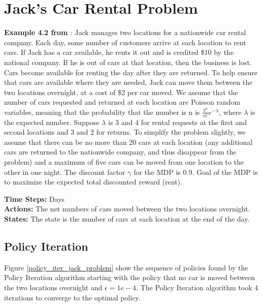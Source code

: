 \documentclass{article}
\newcommand{\citecustom}[1]{\citeauthor{#1} \cite{#1}}
\begin{document}
\section{Jack's Car Rental Problem}
\textbf{Example 4.2 from \citecustom{sutton2018reinforcement}}: Jack manages two locations for a nationwide car
rental company. Each day, some number of customers arrive at each location to rent cars.
If Jack has a car available, he rents it out and is credited \$10 by the national company.
If he is out of cars at that location, then the business is lost. Cars become available for
renting the day after they are returned. To help ensure that cars are available where
they are needed, Jack can move them between the two locations overnight, at a cost of
\$2 per car moved. We assume that the number of cars requested and returned at each
location are Poisson random variables, meaning that the probability that the number is
n is $\frac{\lambda^{n}}{n!}e^{-\lambda}$, where $\lambda$ is the expected number. Suppose $\lambda$ is 3 and 4 for rental requests at
the first and second locations and 3 and 2 for returns. To simplify the problem slightly,
we assume that there can be no more than 20 cars at each location (any additional cars
are returned to the nationwide company, and thus disappear from the problem) and a
maximum of five cars can be moved from one location to the other in one night. The discount factor $\gamma$ for the MDP is 0.9.
Goal of the MDP is to maximize the expected total discounted reward (rent). \par
	
\noindent %
\textbf{Time Steps:} Days \\
\textbf{Actions:} The net numbers of cars moved between the two locations overnight. \\
\textbf{States:} The state is the number of cars at each location at the end of the day. 

\subsection{Policy Iteration}
Figure \ref{policy_iter_jack_problem} show the sequence of policies found by the Policy Iteration algorithm starting with the policy that no car
is moved between the two locations overnight and $\epsilon=1e-4$. The Policy Iteration algorithm took 4 iterations to converge
to the optimal policy.
\end{document}

